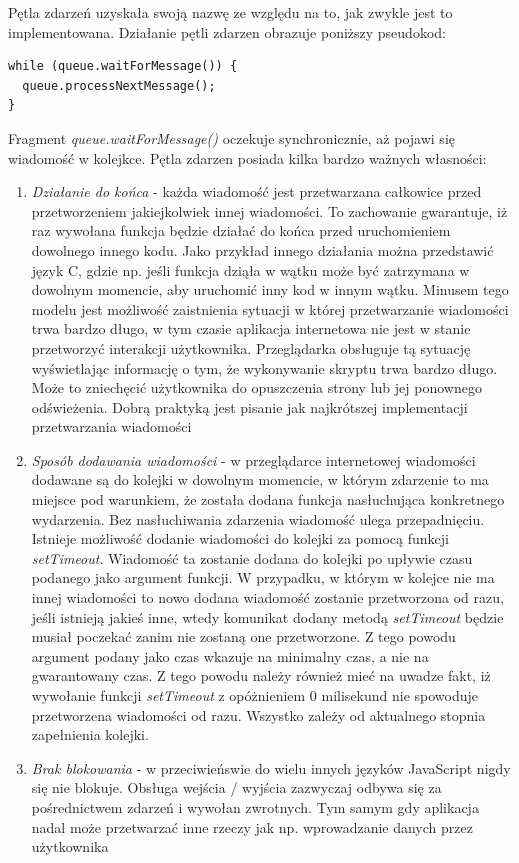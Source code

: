 \documentclass[polish, twoside, 12pt]{mwart}
\begin{document}
Pętla zdarzeń uzyskała swoją nazwę ze względu na to, jak zwykle jest to implementowana. Działanie pętli zdarzen obrazuje poniższy pseudokod:

\begin{lstlisting}
while (queue.waitForMessage()) {
  queue.processNextMessage();
}
\end{lstlisting}

Fragment \emph{queue.waitForMessage()} oczekuje synchronicznie, aż pojawi się wiadomość w kolejkce. Pętla zdarzen posiada kilka bardzo ważnych własności:

\begin{enumerate}
  \item \emph{Działanie do końca} - każda wiadomość jest przetwarzana całkowice przed przetworzeniem jakiejkolwiek innej wiadomości. To zachowanie gwarantuje, iż raz wywołana funkcja będzie działać do końca przed uruchomieniem dowolnego innego kodu. Jako przykład innego działania można przedstawić język C, gdzie np. jeśli funkcja dziąła w wątku może być zatrzymana w dowolnym momencie, aby uruchomić inny kod w innym wątku. Minusem tego modelu jest możliwość zaistnienia sytuacji w której przetwarzanie wiadomości trwa bardzo długo, w tym czasie aplikacja internetowa nie jest w stanie przetworzyć interakcji użytkownika. Przeglądarka obsługuje tą sytuację wyświetlając informację o tym, że wykonywanie skryptu trwa bardzo długo. Może to zniechęcić użytkownika do opuszczenia strony lub jej ponownego odświeżenia. Dobrą praktyką jest pisanie jak najkrótszej implementacji przetwarzania wiadomości
  \item \emph{Sposób dodawania wiadomości} - w przeglądarce internetowej wiadomości dodawane są do kolejki w dowolnym momencie, w którym zdarzenie to ma miejsce pod warunkiem, że została dodana funkcja nasłuchująca konkretnego wydarzenia. Bez nasłuchiwania zdarzenia wiadomość ulega przepadnięciu. Istnieje możliwość dodanie wiadomości do kolejki za pomocą funkcji \emph{setTimeout}. Wiadomość ta zostanie dodana do kolejki po upływie czasu podanego jako argument funkcji. W przypadku, w którym w kolejce nie ma innej wiadomości to nowo dodana wiadomość zostanie przetworzona od razu, jeśli istnieją jakieś inne, wtedy komunikat dodany metodą \emph{setTimeout} będzie musiał poczekać zanim nie zostaną one przetworzone. Z tego powodu argument podany jako czas wkazuje na minimalny czas, a nie na gwarantowany czas. Z tego powodu należy również mieć na uwadze fakt, iż wywołanie funkcji \emph{setTimeout} z opóżnieniem 0 milisekund nie spowoduje przetworzena wiadomości od razu. Wszystko zależy od aktualnego stopnia zapełnienia kolejki.
  \item \emph{Brak blokowania} - w przeciwieńswie do wielu innych języków JavaScript nigdy się nie blokuje. Obsługa wejścia / wyjścia zazwyczaj odbywa się za pośrednictwem zdarzeń i wywołan zwrotnych. Tym samym gdy aplikacja nadal może przetwarzać inne rzeczy jak np. wprowadzanie danych przez użytkownika
\end{enumerate}
\end{document}
